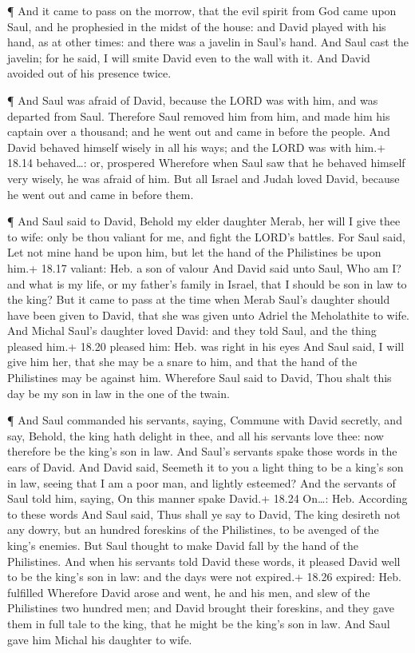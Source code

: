  ¶ And it came to pass on the morrow, that the evil spirit
from God came upon Saul, and he prophesied in the midst of the house:
and David played with his hand, as at other times: and there was a
javelin in Saul's hand.  And Saul cast the javelin; for he
said, I will smite David even to the wall with it. And David avoided out
of his presence twice.

 ¶ And Saul was afraid of David, because the LORD was with
him, and was departed from Saul.  Therefore Saul removed
him from him, and made him his captain over a thousand; and he went out
and came in before the people.  And David behaved himself
wisely in all his ways; and the LORD was with him.+ 18.14 behaved\ldots:
or, prospered  Wherefore when Saul saw that he behaved
himself very wisely, he was afraid of him.  But all Israel
and Judah loved David, because he went out and came in before them.

 ¶ And Saul said to David, Behold my elder daughter Merab,
her will I give thee to wife: only be thou valiant for me, and fight the
LORD's battles. For Saul said, Let not mine hand be upon him, but let
the hand of the Philistines be upon him.+ 18.17 valiant: Heb. a son of
valour  And David said unto Saul, Who am I? and what is my
life, or my father's family in Israel, that I should be son in law to
the king?  But it came to pass at the time when Merab
Saul's daughter should have been given to David, that she was given unto
Adriel the Meholathite to wife.  And Michal Saul's daughter
loved David: and they told Saul, and the thing pleased him.+ 18.20
pleased him: Heb. was right in his eyes  And Saul said, I
will give him her, that she may be a snare to him, and that the hand of
the Philistines may be against him. Wherefore Saul said to David, Thou
shalt this day be my son in law in the one of the twain.

 ¶ And Saul commanded his servants, saying, Commune with
David secretly, and say, Behold, the king hath delight in thee, and all
his servants love thee: now therefore be the king's son in law.
 And Saul's servants spake those words in the ears of
David. And David said, Seemeth it to you a light thing to be a king's
son in law, seeing that I am a poor man, and lightly esteemed?
 And the servants of Saul told him, saying, On this manner
spake David.+ 18.24 On\ldots: Heb. According to these words
 And Saul said, Thus shall ye say to David, The king
desireth not any dowry, but an hundred foreskins of the Philistines, to
be avenged of the king's enemies. But Saul thought to make David fall by
the hand of the Philistines.  And when his servants told
David these words, it pleased David well to be the king's son in law:
and the days were not expired.+ 18.26 expired: Heb. fulfilled
 Wherefore David arose and went, he and his men, and slew
of the Philistines two hundred men; and David brought their foreskins,
and they gave them in full tale to the king, that he might be the king's
son in law. And Saul gave him Michal his daughter to wife.

